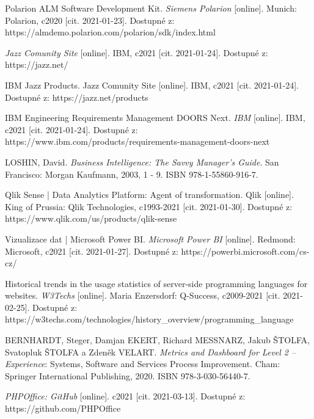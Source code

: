 \documentclass[czech,master]{diploma}
\begin{document}
\begin{thebibliography}{43}
Polarion ALM Software Development Kit. \textit{Siemens Polarion} [online]. Munich: Polarion, c2020 [cit. 2021-01-23]. Dostupné z: https://almdemo.polarion.com/polarion/sdk/index.html

\textit{Jazz Comunity Site} [online]. IBM, c2021 [cit. 2021-01-24]. Dostupné z: https://jazz.net/

IBM Jazz Products. Jazz Comunity Site [online]. IBM, c2021 [cit. 2021-01-24]. Dostupné z: https://jazz.net/products

IBM Engineering Requirements Management DOORS Next. \textit{IBM} [online]. IBM, c2021 [cit. 2021-01-24]. Dostupné z: https://www.ibm.com/products/requirements-management-doors-next

LOSHIN, David. \textit{Business Intelligence: The Savvy Manager's Guide}. San Francisco: Morgan Kaufmann, 2003, 1 - 9. ISBN 978-1-55860-916-7.

Qlik Sense | Data Analytics Platform: Agent of transformation. Qlik [online]. King of Prussia: Qlik Technologies, c1993-2021 [cit. 2021-01-30]. Dostupné z: https://www.qlik.com/us/products/qlik-sense

Vizualizace dat | Microsoft Power BI. \textit{Microsoft Power BI} [online]. Redmond: Microsoft, c2021 [cit. 2021-01-27]. Dostupné z: https://powerbi.microsoft.com/cs-cz/

Historical trends in the usage statistics of server-side programming languages for websites. \textit{W3Techs} [online]. Maria Enzersdorf: Q-Success, c2009-2021 [cit. 2021-02-25]. Dostupné z: https://w3techs.com/technologies/history\_overview/programming\_language

BERNHARDT, Steger, Damjan EKERT, Richard MESSNARZ, Jakub ŠTOLFA, Svatopluk ŠTOLFA a Zdeněk VELART. \textit{Metrics and Dashboard for Level 2 – Experience}: Systems, Software and Services Process Improvement. Cham: Springer International Publishing, 2020. ISBN 978-3-030-56440-7.

\textit{PHPOffice: GitHub} [online]. c2021 [cit. 2021-03-13]. Dostupné z: https://github.com/PHPOffice


\end{thebibliography}


\appendix
\end{document}
